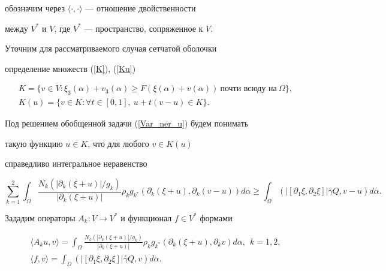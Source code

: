 обозначим через $\langle \cdot,\cdot \rangle$ --- отношение двойственности 


между $V^*$ и $V$, где $V^*$ --- пространство, сопряженное к $V$.





Уточним для рассматриваемого случая сетчатой оболочки


определение множеств (\ref{K}), (\ref{Ku})


\begin{gather*}


K=\{v \in V: \xi_3(\alpha)+v_3(\alpha ) \geq F(\xi(\alpha)+v(\alpha )) 


\ \text{почти всюду на} \ \Omega \}, \\


%


K(u)=\{v \in K : \forall t \in [0,1],\ u+t ( v -u ) \in K \} .


\end{gather*}





Под решением обобщенной задачи (\ref{Var_ner_u}) будем понимать 


такую функцию $u \in K$, что для любого $v \in K(u)$


справедливо интегральное неравенство


\begin{equation}


\sum_{k=1}^{2} \int_\Omega


\frac{N_k (|\partial_k (\xi+u ) | / g_k )} {|\partial_k (\xi+u ) |} 


\rho_k g_{k^*} ( \partial_k (\xi+u ), \partial_k (v-u)) d\alpha \geq 


\int_\Omega


(|[\partial_1 \xi,\partial_2 \xi]| \overset{\circ}{\gamma}{}Q, v-u) d\alpha.


\label{Int_ner_sell}


\end{equation}


Зададим операторы $A_k: V \to V^{*}$ и функционал $f \in V^*$ формами


\begin{gather*} 


\langle A_k u, v \rangle=\int_\Omega \frac


{N_k (|\partial_k (\xi+u ) | / g_k )} {|\partial_k (\xi+u ) |} 


\rho_k g_{k^*} ( \partial_k (\xi+u), \partial_k v) d\alpha,\ \ k=1,2, \\


%


\langle f, v \rangle=\int_\Omega 


(| [\partial_1 \xi,\partial_2 \xi ] | \overset{\circ}{\gamma}{}Q, v) d\alpha. 


\end{gather*}





